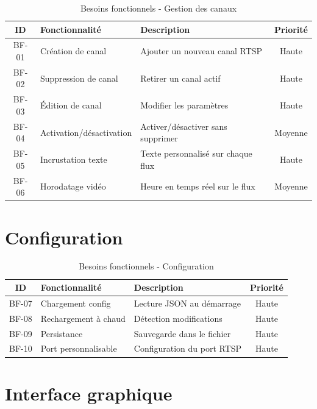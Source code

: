 \documentclass[12pt,a4paper]{report}
\begin{document}
\begin{table}[H]
    \centering
    \caption{Besoins fonctionnels - Gestion des canaux}
    \label{tab:bf1}
    \begin{tabular}{|c|l|l|c|}
        \hline
        \textbf{ID} & \textbf{Fonctionnalité} & \textbf{Description} & \textbf{Priorité} \\
        \hline
        BF-01 & Création de canal & Ajouter un nouveau canal RTSP & Haute \\
        BF-02 & Suppression de canal & Retirer un canal actif & Haute \\
        BF-03 & Édition de canal & Modifier les paramètres & Haute \\
        BF-04 & Activation/désactivation & Activer/désactiver sans supprimer & Moyenne \\
        BF-05 & Incrustation texte & Texte personnalisé sur chaque flux & Haute \\
        BF-06 & Horodatage vidéo & Heure en temps réel sur le flux & Moyenne \\
        \hline
    \end{tabular}
\end{table}

\section{Configuration}

\begin{table}[H]
    \centering
    \caption{Besoins fonctionnels - Configuration}
    \label{tab:bf2}
    \begin{tabular}{|c|l|l|c|}
        \hline
        \textbf{ID} & \textbf{Fonctionnalité} & \textbf{Description} & \textbf{Priorité} \\
        \hline
        BF-07 & Chargement config & Lecture JSON au démarrage & Haute \\
        BF-08 & Rechargement à chaud & Détection modifications & Haute \\
        BF-09 & Persistance & Sauvegarde dans le fichier & Haute \\
        BF-10 & Port personnalisable & Configuration du port RTSP & Haute \\
        \hline
    \end{tabular}
\end{table}

\section{Interface graphique}
\end{document}

